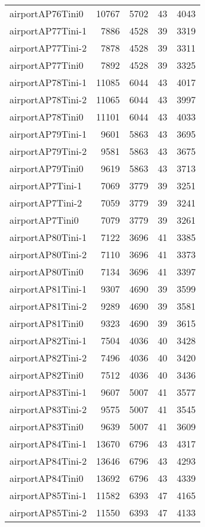 \begin{longtable}{lrrrr}
airportAP76Tini0 & 10767 & 5702 & 43 & 4043 \\
airportAP77Tini-1 & 7886 & 4528 & 39 & 3319 \\
airportAP77Tini-2 & 7878 & 4528 & 39 & 3311 \\
airportAP77Tini0 & 7892 & 4528 & 39 & 3325 \\
airportAP78Tini-1 & 11085 & 6044 & 43 & 4017 \\
airportAP78Tini-2 & 11065 & 6044 & 43 & 3997 \\
airportAP78Tini0 & 11101 & 6044 & 43 & 4033 \\
airportAP79Tini-1 & 9601 & 5863 & 43 & 3695 \\
airportAP79Tini-2 & 9581 & 5863 & 43 & 3675 \\
airportAP79Tini0 & 9619 & 5863 & 43 & 3713 \\
airportAP7Tini-1 & 7069 & 3779 & 39 & 3251 \\
airportAP7Tini-2 & 7059 & 3779 & 39 & 3241 \\
airportAP7Tini0 & 7079 & 3779 & 39 & 3261 \\
airportAP80Tini-1 & 7122 & 3696 & 41 & 3385 \\
airportAP80Tini-2 & 7110 & 3696 & 41 & 3373 \\
airportAP80Tini0 & 7134 & 3696 & 41 & 3397 \\
airportAP81Tini-1 & 9307 & 4690 & 39 & 3599 \\
airportAP81Tini-2 & 9289 & 4690 & 39 & 3581 \\
airportAP81Tini0 & 9323 & 4690 & 39 & 3615 \\
airportAP82Tini-1 & 7504 & 4036 & 40 & 3428 \\
airportAP82Tini-2 & 7496 & 4036 & 40 & 3420 \\
airportAP82Tini0 & 7512 & 4036 & 40 & 3436 \\
airportAP83Tini-1 & 9607 & 5007 & 41 & 3577 \\
airportAP83Tini-2 & 9575 & 5007 & 41 & 3545 \\
airportAP83Tini0 & 9639 & 5007 & 41 & 3609 \\
airportAP84Tini-1 & 13670 & 6796 & 43 & 4317 \\
airportAP84Tini-2 & 13646 & 6796 & 43 & 4293 \\
airportAP84Tini0 & 13692 & 6796 & 43 & 4339 \\
airportAP85Tini-1 & 11582 & 6393 & 47 & 4165 \\
airportAP85Tini-2 & 11550 & 6393 & 47 & 4133 \\

\end{longtable}
